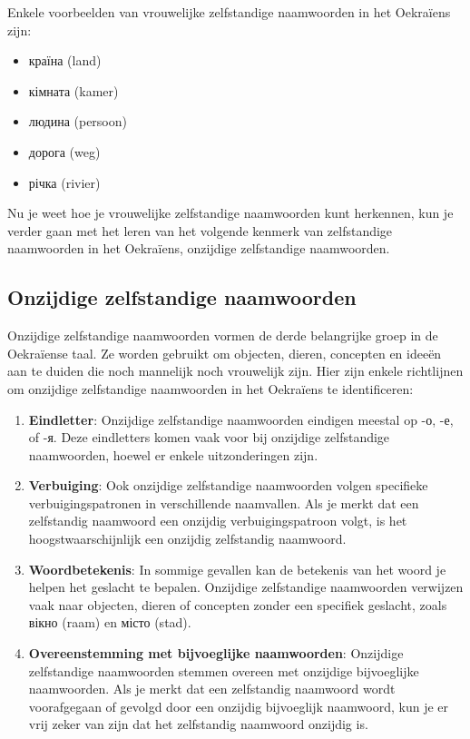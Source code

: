 \documentclass[
  letterpaper,
  DIV=11,
  numbers=noendperiod]{scrreprt}
\providecommand{\tightlist}{%
  \setlength{\itemsep}{0pt}\setlength{\parskip}{0pt}}\usepackage{longtable,booktabs,array}
\begin{document}
Enkele voorbeelden van vrouwelijke zelfstandige naamwoorden in het
Oekraïens zijn:

\begin{itemize}
\tightlist
\item
  країна (land)
\item
  кімната (kamer)
\item
  людина (persoon)
\item
  дорога (weg)
\item
  річка (rivier)
\end{itemize}

Nu je weet hoe je vrouwelijke zelfstandige naamwoorden kunt herkennen,
kun je verder gaan met het leren van het volgende kenmerk van
zelfstandige naamwoorden in het Oekraïens, onzijdige zelfstandige
naamwoorden.

\hypertarget{onzijdige-zelfstandige-naamwoorden}{%
\subsection{Onzijdige zelfstandige
naamwoorden}\label{onzijdige-zelfstandige-naamwoorden}}

Onzijdige zelfstandige naamwoorden vormen de derde belangrijke groep in
de Oekraïense taal. Ze worden gebruikt om objecten, dieren, concepten en
ideeën aan te duiden die noch mannelijk noch vrouwelijk zijn. Hier zijn
enkele richtlijnen om onzijdige zelfstandige naamwoorden in het
Oekraïens te identificeren:

\begin{enumerate}
\def\labelenumi{\arabic{enumi}.}
\item
  \textbf{Eindletter}: Onzijdige zelfstandige naamwoorden eindigen
  meestal op -о, -е, of -я. Deze eindletters komen vaak voor bij
  onzijdige zelfstandige naamwoorden, hoewel er enkele uitzonderingen
  zijn.
\item
  \textbf{Verbuiging}: Ook onzijdige zelfstandige naamwoorden volgen
  specifieke verbuigingspatronen in verschillende naamvallen. Als je
  merkt dat een zelfstandig naamwoord een onzijdig verbuigingspatroon
  volgt, is het hoogstwaarschijnlijk een onzijdig zelfstandig naamwoord.
\item
  \textbf{Woordbetekenis}: In sommige gevallen kan de betekenis van het
  woord je helpen het geslacht te bepalen. Onzijdige zelfstandige
  naamwoorden verwijzen vaak naar objecten, dieren of concepten zonder
  een specifiek geslacht, zoals вікно (raam) en місто (stad).
\item
  \textbf{Overeenstemming met bijvoeglijke naamwoorden}: Onzijdige
  zelfstandige naamwoorden stemmen overeen met onzijdige bijvoeglijke
  naamwoorden. Als je merkt dat een zelfstandig naamwoord wordt
  voorafgegaan of gevolgd door een onzijdig bijvoeglijk naamwoord, kun
  je er vrij zeker van zijn dat het zelfstandig naamwoord onzijdig is.
\end{enumerate}
\end{document}
